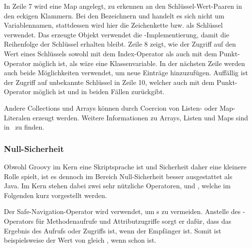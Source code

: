 \documentclass[a4paper]{article}
\begin{document}
In Zeile 7 wird eine Map angelegt, zu erkennen an den Schlüssel-Wert-Paaren in den eckigen Klammern.
Bei den Bezeichnern  und  handelt es sich nicht um Variablennamen, stattdessen wird hier die Zeichenkette  bzw.  als Schlüssel verwendet.
Das erzeugte Objekt verwendet die -Implementierung, damit die Reihenfolge der Schlüssel erhalten bleibt.
Zeile 8 zeigt, wie der Zugriff auf den Wert eines Schlüssels sowohl mit dem Index-Operator als auch mit dem Punkt-Operator möglich ist, als wäre  eine Klassenvariable.
In der nächsten Zeile werden auch beide Möglichkeiten verwendet, um neue Einträge hinzuzufügen.
Auffällig ist der Zugriff auf unbekannte Schlüssel in Zeile 10, welcher auch mit dem Punkt-Operator möglich ist und in beiden Fällen  zurückgibt.

Andere Collections und Arrays können durch Coercion von Listen- oder Map-Literalen erzeugt werden.
Weitere Informationen zu Arrays, Listen und Maps sind in~\cite[Abs.~7.-9.]{groovy-lang:syntax} zu finden.

\subsubsection{Null-Sicherheit}

Obwohl Groovy im Kern eine Skriptsprache ist und Sicherheit daher eine kleinere Rolle spielt, ist es dennoch im Bereich Null-Sicherheit besser ausgestattet als Java.
Im Kern stehen dabei zwei sehr nützliche Operatoren,  und , welche im Folgenden kurz vorgestellt werden.

Der Safe-Navigation-Operator  wird verwendet, um s zu vermeiden.
Anstelle des -Operators für Methodenaufrufe und Attributzugriffe sorgt er dafür, dass das Ergebnis des Aufrufs oder Zugriffs  ist, wenn der Empfänger  ist.
Somit ist beispielsweise der Wert von  gleich , wenn  schon  ist.
\end{document}
